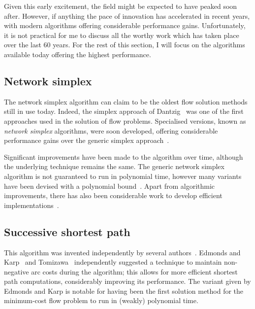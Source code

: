 Given this early excitement, the field might be expected to have peaked soon after. However, if anything the pace of innovation has accelerated in recent years, with modern algorithms offering considerable performance gains. Unfortunately, it is not practical for me to discuss all the worthy work which has taken place over the last 60 years. For the rest of this section, I will focus on the algorithms available today offering the highest performance.

\subsection{Network simplex}

The network simplex algorithm can claim to be the oldest flow solution methods still in use today. Indeed, the simplex approach of Dantzig~\cite{Dantzig:1949} was one of the first approaches used in the solution of flow problems. Specialised versions, known as \emph{network simplex} algorithms, were soon developed, offering considerable performance gains over the generic simplex approach~\cite{Dantzig:1962}.

Significant improvements have been made to the algorithm over time, although the underlying technique remains the same. The generic network simplex algorithm is not guaranteed to run in polynomial time\footnotemark, however many variants have been devised with a polynomial bound~\cite{Tarjan:1991,Goldfarb:1992}. Apart from algorithmic improvements, there has also been considerable work to develop efficient implementations~\cite{Lobel:1996,Grigoriadis:1986}.

\subsection{Successive shortest path} \label{sec:intro-related-work-ssp}

This algorithm was invented independently by several authors~\cite{Jewell:1958,Iri:1960,BusackerGowen:1960}. Edmonds and Karp~\cite{Edmonds:1972} and Tomizawa~\cite{Tomizawa:1971} independently suggested a technique to maintain non-negative arc costs during the algorithm; this allows for more efficient shortest path computations, considerably improving its performance. The variant given by Edmonds and Karp is notable for having been the first solution method for the minimum-cost flow problem to run in (weakly) polynomial time\footnotemark.

